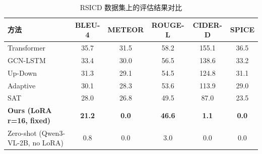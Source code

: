 
\begin{table}[htbp]
  \centering
  \caption{RSICD 数据集上的评估结果对比}
  \label{tab:benchmark_rsicd}
  \begin{tabular}{lccccc}
    \toprule
    方法 & BLEU-4 & METEOR & ROUGE-L & CIDER-D & SPICE \\
    \midrule
    Transformer &     35.7 &     31.5 &     58.2 &     155.1 &     36.5 \\
    GCN-LSTM &     33.4 &     30.0 &     56.5 &     138.6 &     33.2 \\
    Up-Down &     31.3 &     29.1 &     54.5 &     124.8 &     31.1 \\
    Adaptive &     30.1 &     28.3 &     53.6 &     113.9 &     29.0 \\
    SAT &     28.0 &     26.8 &     49.5 &     87.0 &     23.5 \\
    \textbf{Ours (LoRA r=16, fixed)} &     \textbf{21.2} &     \textbf{0.0} &     \textbf{46.6} &     \textbf{1.1} &     \textbf{0.0} \\
    Zero-shot (Qwen3-VL-2B, no LoRA) &     0.8 &     0.0 &     3.0 &     0.0 &     0.0 \\
    \bottomrule
  \end{tabular}
\end{table}
